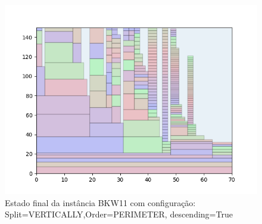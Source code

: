 \begin{figure}[H]
    \centering
    \caption[]{Estado final da instância BKW11 com configuração: Split=VERTICALLY,Order=PERIMETER, descending=True}
    \label{fig:bkw11-vertically-perimeter-true}
    \includegraphics[scale=0.5]{output/figures/bkw/bkw11/vertically/perimeter/true/000}
\end{figure}